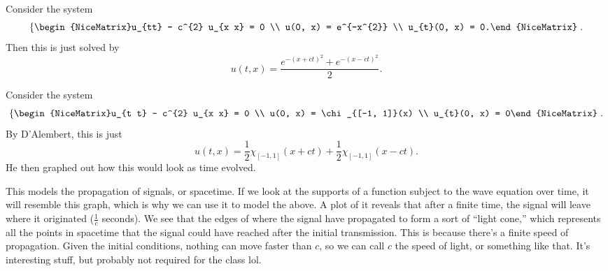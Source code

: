 \begin{example}
	Consider the system
	\[ \left\{\begin{NiceMatrix}u_{tt} - c^{2} u_{x x} = 0 \\ u(0, x) = e^{-x^{2}} \\ u_{t}(0, x) = 0.\end{NiceMatrix}\right..  \]
	Then this is just solved by
	\[ u(t, x) = \frac{e^{-(x+ct)^{2}} + e^{-(x-ct)^{2}}}{2}. \]
\end{example}
\begin{example}
	Consider the system
	\[ \left\{\begin{NiceMatrix}u_{t t} - c^{2} u_{x x} = 0 \\ u(0, x) = \chi_{[-1, 1]}(x) \\ u_{t}(0, x) = 0\end{NiceMatrix}\right..  \]
	By D'Alembert, this is just
	\[ u(t, x) = \frac{1}{2} \chi_{[-1, 1]}(x + ct) + \frac{1}{2} \chi_{[-1, 1]}(x - ct). \]
	He then graphed out how this would look as time evolved. 
\end{example}

	This models the propagation of signals, or spacetime. If we look at the supports of a function subject to the wave equation over time, it will resemble this graph, which is why we can use it to model the above. A plot of it reveals that after a finite time, the signal will leave where it originated (\( \frac{1}{c} \) seconds). We see that the edges of where the signal have propagated to form a sort of ``light cone,'' which represents all the points in spacetime that the signal could have reached after the initial transmission. This is because there's a finite speed of propagation. Given the initial conditions, nothing can move faster than \( c \), so we can call \( c \) the speed of light, or something like that. It's interesting stuff, but probably not required for the class lol.
